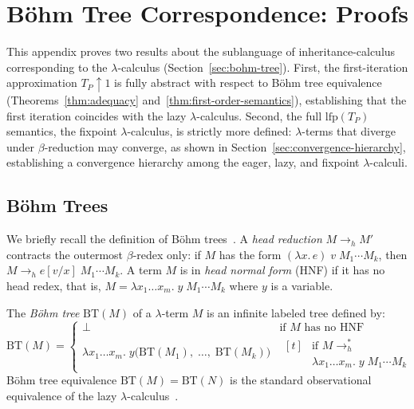 \section{B\"ohm Tree Correspondence: Proofs}
\label{app:bohm-tree-proofs}

This appendix proves two results about the sublanguage of
inheritance-calculus corresponding to the $\lambda$-calculus
(Section~\ref{sec:bohm-tree}).
First, the first-iteration approximation
$T_P\!\uparrow\!1$ is fully abstract with respect to
B\"ohm tree equivalence
(Theorems~\ref{thm:adequacy} and~\ref{thm:first-order-semantics}),
establishing that the first iteration coincides with
the lazy $\lambda$-calculus.
Second, the full $\mathrm{lfp}(T_P)$ semantics,
the fixpoint $\lambda$-calculus, is strictly more defined:
$\lambda$-terms that diverge under $\beta$-reduction
may converge, as shown in Section~\ref{sec:convergence-hierarchy},
establishing a convergence hierarchy among the eager,
lazy, and fixpoint $\lambda$-calculi.

\subsection{B\"ohm Trees}

We briefly recall the definition of B\"ohm
trees~\cite{barendregt1984-lambda-calculus}.
A \emph{head reduction} $M \to_h M'$ contracts
the outermost $\beta$-redex only: if $M$ has the form
$(\lambda x.\, e)\; v\; M_1 \cdots M_k$, then
$M \to_h e[v/x]\; M_1 \cdots M_k$.
A term $M$ is in \emph{head normal form} (HNF) if it has no
head redex, that is, $M = \lambda x_1 \ldots x_m.\;
y\; M_1 \cdots M_k$ where $y$ is a variable.

The \emph{B\"ohm tree} $\mathrm{BT}(M)$ of a $\lambda$-term $M$
is an infinite labeled tree defined by:
\[
  \mathrm{BT}(M) =
  \begin{cases}
    \bot & \text{if } M \text{ has no HNF} \\[6pt]
    \lambda x_1 \ldots x_m.\;
    y\bigl(\mathrm{BT}(M_1),\; \ldots,\; \mathrm{BT}(M_k)\bigr)
    &
    \begin{aligned}[t]
      &\text{if } M \to^*_h \\[-2pt]
      &\lambda x_1 \ldots x_m.\; y\; M_1 \cdots M_k
    \end{aligned}
  \end{cases}
\]
B\"ohm tree equivalence $\mathrm{BT}(M) = \mathrm{BT}(N)$ is the
standard observational equivalence of the lazy
$\lambda$-calculus~\cite{abramsky1993-full-abstraction-lazy-lambda,abramsky1995-games-full-abstraction-lazy-lambda}.

